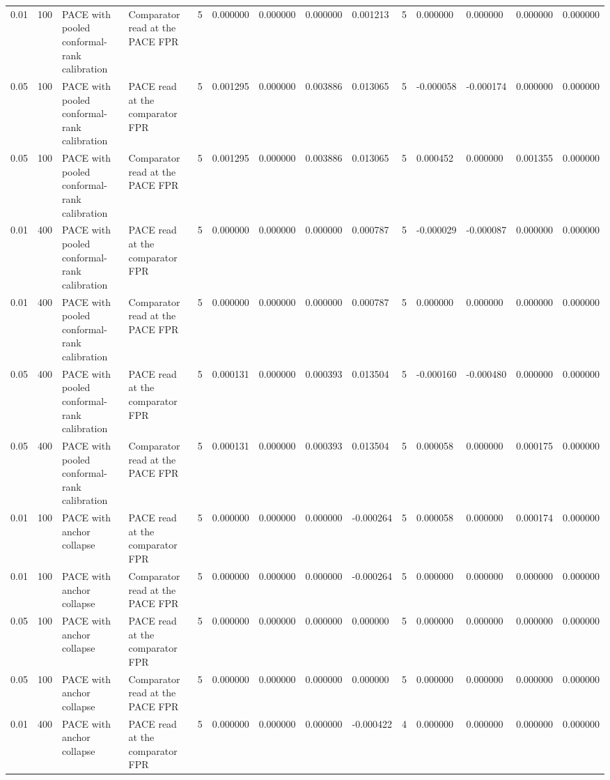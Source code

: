 \begin{tabular}{llllllllllllll}
0.01 & 100 & PACE with pooled conformal-rank calibration & Comparator read at the PACE FPR & 5 & 0.000000 & 0.000000 & 0.000000 & 0.001213 & 5 & 0.000000 & 0.000000 & 0.000000 & 0.000000 \\
0.05 & 100 & PACE with pooled conformal-rank calibration & PACE read at the comparator FPR & 5 & 0.001295 & 0.000000 & 0.003886 & 0.013065 & 5 & -0.000058 & -0.000174 & 0.000000 & 0.000000 \\
0.05 & 100 & PACE with pooled conformal-rank calibration & Comparator read at the PACE FPR & 5 & 0.001295 & 0.000000 & 0.003886 & 0.013065 & 5 & 0.000452 & 0.000000 & 0.001355 & 0.000000 \\
0.01 & 400 & PACE with pooled conformal-rank calibration & PACE read at the comparator FPR & 5 & 0.000000 & 0.000000 & 0.000000 & 0.000787 & 5 & -0.000029 & -0.000087 & 0.000000 & 0.000000 \\
0.01 & 400 & PACE with pooled conformal-rank calibration & Comparator read at the PACE FPR & 5 & 0.000000 & 0.000000 & 0.000000 & 0.000787 & 5 & 0.000000 & 0.000000 & 0.000000 & 0.000000 \\
0.05 & 400 & PACE with pooled conformal-rank calibration & PACE read at the comparator FPR & 5 & 0.000131 & 0.000000 & 0.000393 & 0.013504 & 5 & -0.000160 & -0.000480 & 0.000000 & 0.000000 \\
0.05 & 400 & PACE with pooled conformal-rank calibration & Comparator read at the PACE FPR & 5 & 0.000131 & 0.000000 & 0.000393 & 0.013504 & 5 & 0.000058 & 0.000000 & 0.000175 & 0.000000 \\
0.01 & 100 & PACE with anchor collapse & PACE read at the comparator FPR & 5 & 0.000000 & 0.000000 & 0.000000 & -0.000264 & 5 & 0.000058 & 0.000000 & 0.000174 & 0.000000 \\
0.01 & 100 & PACE with anchor collapse & Comparator read at the PACE FPR & 5 & 0.000000 & 0.000000 & 0.000000 & -0.000264 & 5 & 0.000000 & 0.000000 & 0.000000 & 0.000000 \\
0.05 & 100 & PACE with anchor collapse & PACE read at the comparator FPR & 5 & 0.000000 & 0.000000 & 0.000000 & 0.000000 & 5 & 0.000000 & 0.000000 & 0.000000 & 0.000000 \\
0.05 & 100 & PACE with anchor collapse & Comparator read at the PACE FPR & 5 & 0.000000 & 0.000000 & 0.000000 & 0.000000 & 5 & 0.000000 & 0.000000 & 0.000000 & 0.000000 \\
0.01 & 400 & PACE with anchor collapse & PACE read at the comparator FPR & 5 & 0.000000 & 0.000000 & 0.000000 & -0.000422 & 4 & 0.000000 & 0.000000 & 0.000000 & 0.000000 \\

\end{tabular}
